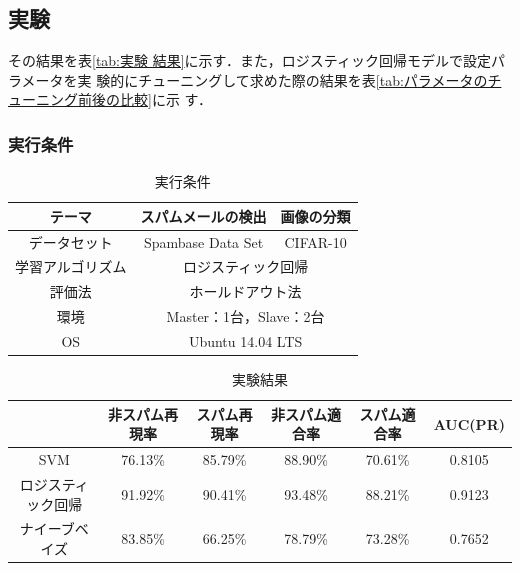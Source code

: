 \documentclass[a4paper,12pt]{jarticle}
\begin{document}
\subsection{実験}
その結果を表\ref{tab:実験
結果}に示す．また，ロジスティック回帰モデルで設定パラメータを実
験的にチューニングして求めた際の結果を表\ref{tab:パラメータのチューニング前後の比較}に示
す．

\subsubsection{実行条件}

\begin{table}[hbtp]
\centering
\caption{実行条件}
\label{tab:実行条件}
\fontsize{9pt}{10pt}\selectfont
 \begin{tabular}{|c||c|c|} \hline
 テーマ &スパムメールの検出& 画像の分類\\ \hline \hline
データセット& Spambase Data Set& CIFAR-10\\ \hline
  学習アルゴリズム& \multicolumn{2}{|c|}{ロジスティック回帰}\\ \hline
  評価法&\multicolumn{2}{|c|}{ホールドアウト法}\\ \hline
  環境&\multicolumn{2}{|c|}{Master：1台，Slave：2台}\\ \hline
  OS&\multicolumn{2}{|c|}{Ubuntu 14.04 LTS}\\ \hline
\end{tabular}
\end{table}

\begin{table}[hbt]
\centering
\caption{実験結果}
\label{tab:実験結果}
\fontsize{9pt}{10pt}\selectfont
\begin{tabular}{|c|c|c|c|c|c|} \hline
 &非スパム再現率&スパム再現率&非スパム適合率&スパム適合率&AUC(PR) \\ \hline
SVM& 76.13\%& 85.79\%& 88.90\%& 70.61\% & 0.8105 \\ \hline
ロジスティック回帰&91.92\% & 90.41\% & 93.48\% & 88.21\% & 0.9123 \\ \hline
ナイーブベイズ& 83.85\% & 66.25\% & 78.79\%  & 73.28\% & 0.7652  \\ \hline
\end{tabular}
\end{table}
\end{document}
